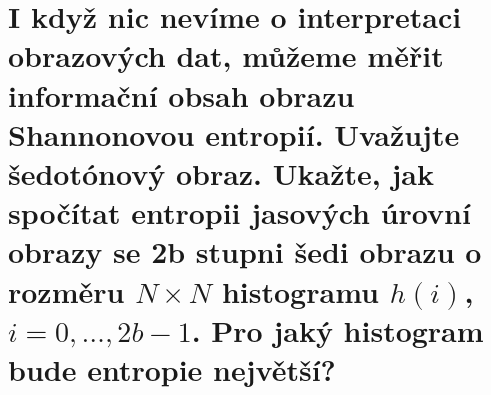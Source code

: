 \section{I když nic nevíme o interpretaci obrazových dat, můžeme měřit informační obsah obrazu Shannonovou entropií. 
Uvažujte šedotónový obraz. Ukažte, jak spočítat entropii jasových úrovní obrazy se 2b stupni šedi obrazu o rozměru 
$N \times N$ histogramu $h(i)$, $i=0,\dots,2b-1$. Pro jaký histogram bude entropie největší?}